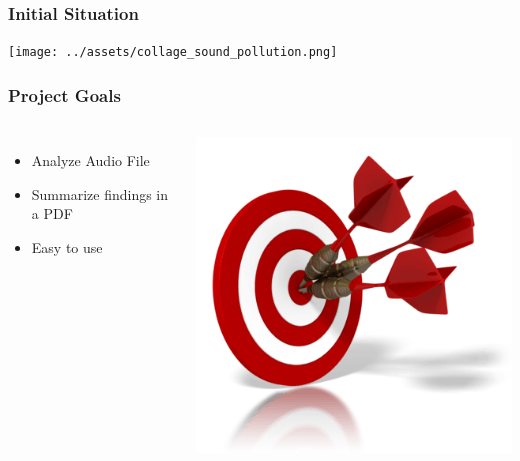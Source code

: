 \begin{frame}
    \frametitle{Initial Situation}
    \centering
    \texttt{[image: ../assets/collage\_sound\_pollution.png]}
\end{frame}

\begin{frame}
    \frametitle{Project Goals}
    \begin{columns}
        \begin{itemize}[<+->]
            \large
            \item Analyze Audio File
            \item Summarize findings in a PDF
            \item Easy to use
        \end{itemize}
        \centering
        \includegraphics[width=1\linewidth]{../assets/target.png}
    \end{columns}
\end{frame}

